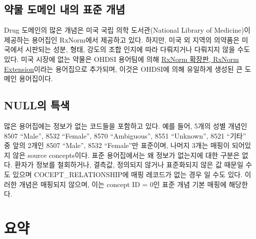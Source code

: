 \documentclass[11pt]{book}
\theoremstyle{definition}
\theoremstyle{definition}
\theoremstyle{definition}
\theoremstyle{remark}
\begin{document}
\subsection{약물 도메인 내의 표준 개념}\label{rxNormExtension}

Drug 도메인의 많은 개념은 미국 국립 의학 도서관(National Library of
Medicine)이 제공하는 용어집인 RxNorm에서 제공하고 있다. 하지만, 미국 외
지역의 의약품은 미국에서 시판되는 성분, 형태, 강도의 조합 인지에 따라
다뤄지거나 다뤄지지 않을 수도 있다. 미국 시장에 없는 약물은 OHDSI
용어팀에 의해
\href{https://www.ohdsi.org/web/wiki/doku.php?id=documentation:vocabulary:rxnorm_extension}{RxNorm
확장판, RxNorm Extension}이라는 용어집으로 추가되며, 이것은 OHDSI에 의해
유일하게 생성된 큰 도메인 용어집이다.

\subsection{NULL의 특색}\label{null-}

많은 용어집에는 정보가 없는 코드들을 포함하고 있다. 예를 들어, 5개의
성별 개념인 8507 ``Male'', 8532 ``Female'', 8570 ``Ambiguous'', 8551
``Unknown'', 8521 ``기타'' 중 앞의 2개인 8507 ``Male'', 8532
``Female''만 표준이며, 나머지 3개는 매핑이 되어있지 않은 source
concepts이다. 표준 용어집에서는 왜 정보가 없는지에 대한 구분은 없다.
환자가 정보를 철회하거나, 결측값, 정의되지 않거나 표준화되지 않은 값
때문일 수도 있으며 COCEPT\_RELATIONSHIP에 매핑 레코드가 없는 경우 일
수도 있다. 이러한 개념은 매핑되지 않으며, 이는 concept ID = 0인 표준
개념 기본 매핑에 해당한다.

\section{요약}\label{-3}
\end{document}
